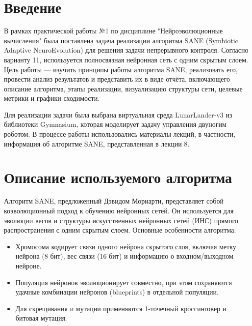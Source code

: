 \documentclass[a4paper,12pt]{article}
\begin{document}
\titleformat{\section}{\normalfont\bfseries}{\thesection}{1em}{}
\titleformat{\subsection}{\normalfont\bfseries}{\thesubsection}{1em}{}
\setlength{\parindent}{15mm}
\onehalfspacing

\section{Введение}
В рамках практической работы №1 по дисциплине "Нейроэволюционные вычисления" была поставлена задача реализации алгоритма SANE (Symbiotic Adaptive NeuroEvolution) для решения задачи непрерывного контроля. Согласно варианту 11, используется полносвязная нейронная сеть с одним скрытым слоем. Цель работы — изучить принципы работы алгоритма SANE, реализовать его, провести анализ результатов и представить их в виде отчёта, включающего описание алгоритма, этапы реализации, визуализацию структуры сети, целевые метрики и графики сходимости.

Для реализации задачи была выбрана виртуальная среда LunarLander-v3 из библиотеки Gymnasium, которая моделирует задачу управления двуногим роботом. В процессе работы использовались материалы лекций, в частности, информация об алгоритме SANE, представленная в лекции 8.

\section{Описание используемого алгоритма}
Алгоритм SANE, предложенный Дэвидом Мориарти, представляет собой коэволюционный подход к обучению нейронных сетей. Он используется для эволюции весов и структуры искусственных нейронных сетей (ИНС) прямого распространения с одним скрытым слоем. Основные особенности алгоритма:

\begin{itemize}
    \item Хромосома кодирует связи одного нейрона скрытого слоя, включая метку нейрона (8 бит), вес связи (16 бит) и информацию о входном/выходном нейроне.
    \item Популяция нейронов эволюционирует совместно, при этом сохраняются удачные комбинации нейронов (blueprints) в отдельной популяции.
    \item Для скрещивания и мутации применяются 1-точечный кроссинговер и битовая мутация.
\end{itemize}
\end{document}
